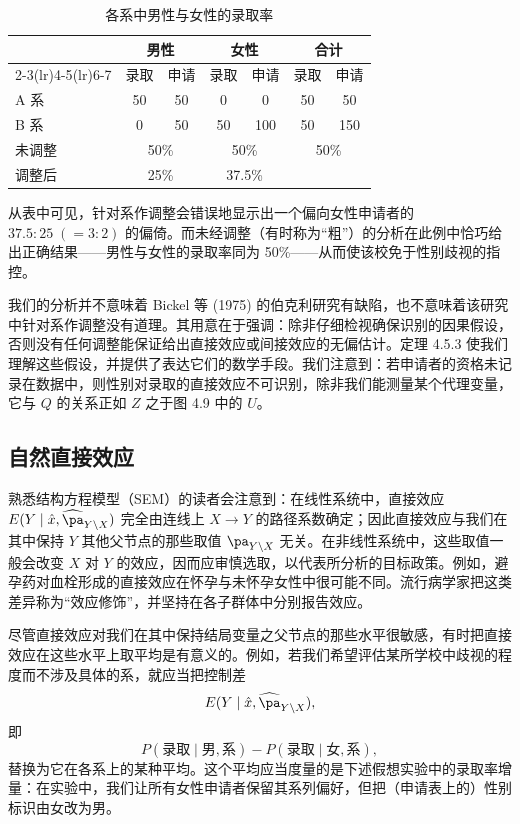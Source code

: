 \begin{table}[htbp]
\centering
\caption{各系中男性与女性的录取率}
\label{tab:4.1}
\small
\begin{tabular}{lcccccc}
\toprule
& \multicolumn{2}{c}{男性} & \multicolumn{2}{c}{女性} & \multicolumn{2}{c}{合计} \\
\cmidrule(lr){2-3}\cmidrule(lr){4-5}\cmidrule(lr){6-7}
& 录取 & 申请 & 录取 & 申请 & 录取 & 申请 \\
\midrule
A 系 & 50 & 50 & 0 & 0 & 50 & 50 \\
B 系 & 0 & 50 & 50 & 100 & 50 & 150 \\
未调整 & \multicolumn{2}{c}{50\%} & \multicolumn{2}{c}{50\%} & \multicolumn{2}{c}{50\%} \\
调整后 & \multicolumn{2}{c}{25\%} & \multicolumn{2}{c}{37.5\%} & \multicolumn{2}{c}{} \\
\bottomrule
\end{tabular}
\end{table}

从表中可见，针对系作调整会错误地显示出一个偏向女性申请者的 $37.5:25\;(=3:2)$ 的偏倚。而未经调整（有时称为“粗”）的分析在此例中恰巧给出正确结果——男性与女性的录取率同为 50\%——从而使该校免于性别歧视的指控。

我们的分析并不意味着 Bickel 等 (1975) 的伯克利研究有缺陷，也不意味着该研究中针对系作调整没有道理。其用意在于强调：除非仔细检视确保识别的因果假设，否则没有任何调整能保证给出直接效应或间接效应的无偏估计。定理 4.5.3 使我们理解这些假设，并提供了表达它们的数学手段。我们注意到：若申请者的资格未记录在数据中，则性别对录取的直接效应不可识别，除非我们能测量某个代理变量，它与 $Q$ 的关系正如 $Z$ 之于图 4.9 中的 $U$。

\subsection{自然直接效应}

熟悉结构方程模型（SEM）的读者会注意到：在线性系统中，直接效应 $E(Y\mid\hat{x},\widehat{\pa}_{Y\backslash X})$ 完全由连线上 $X\to Y$ 的路径系数确定；因此直接效应与我们在其中保持 $Y$ 其他父节点的那些取值 $\pa_{Y\backslash X}$ 无关。在非线性系统中，这些取值一般会改变 $X$ 对 $Y$ 的效应，因而应审慎选取，以代表所分析的目标政策。例如，避孕药对血栓形成的直接效应在怀孕与未怀孕女性中很可能不同。流行病学家把这类差异称为“效应修饰”，并坚持在各子群体中分别报告效应。

尽管直接效应对我们在其中保持结局变量之父节点的那些水平很敏感，有时把直接效应在这些水平上取平均是有意义的。例如，若我们希望评估某所学校中歧视的程度而不涉及具体的系，就应当把控制差
\[
E(Y\mid\hat{x},\widehat{\pa}_{Y\backslash X}),
\]
即
\[
P(\text{录取}\mid\text{男},\text{系})-P(\text{录取}\mid\text{女},\text{系}),
\]
替换为它在各系上的某种平均。这个平均应当度量的是下述假想实验中的录取率增量：在实验中，我们让所有女性申请者保留其系列偏好，但把（申请表上的）性别标识由女改为男。

